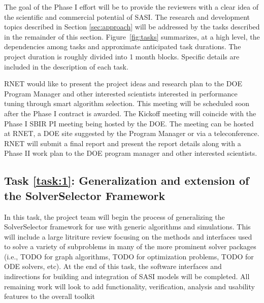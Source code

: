 The goal of the Phase I effort will be to provide the reviewers with a clear idea 
of the scientific and commercial potential of SASI. The research and development topics 
described in Section \ref{sec:approach} will be addressed by the tasks described in the remainder of this section. 
Figure~\ref{fig:tasks} summarizes, at a high level, the dependencies among tasks 
and approximate anticipated task durations. The project duration is roughly 
divided into 1 month blocks. Specific details are included in the description 
of each task. 

RNET would like to present the project ideas and research plan to the DOE 
Program Manager and other interested scientists interested in performance tuning
through smart algorithm selection. This meeting will 
be scheduled soon after the Phase I contract is awarded. The Kickoff meeting 
will coincide with the Phase I SBIR PI meeting being hosted by the DOE. The 
meeting can be hosted at RNET, a DOE site suggested by the Program Manager or 
via a teleconference. RNET will submit a final report and present the report 
details along with a Phase II work plan to the DOE program manager and other 
interested scientists.

%

\setcounter{taskCount}{0}

\label{task:1}
\subsection{Task \ref{task:1}: Generalization and extension of the SolverSelector Framework}
In this task, the project team will begin the process of generalizing the SolverSelector framework for 
use with generic algorithms and simulations. This will include a large litriture review focusing on the methods 
and interfaces used to solve a variety of subproblems in many of the more prominent solver packages (i.e., TODO for 
graph algorithms, TODO for optimization problems, TODO for ODE solvers, etc). At the end of this task, the software interfaces
and indirections for building and integration of SASI models will be completed. All remaining work will look to add functionality, verification, analysis and usability features to the overall toolkit



